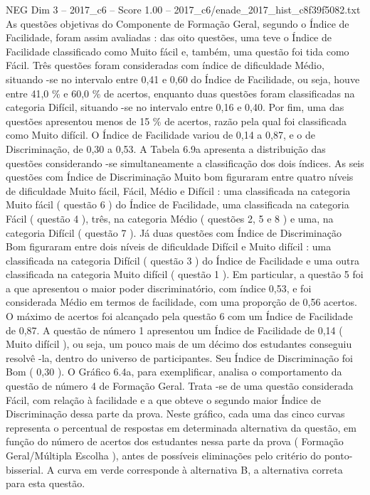 \begin{textsample}{NEG Dim 3 – 2017\_c6 – Score 1.00 – 2017\_c6/enade\_2017\_hist\_c8f39f5082.txt}
As questões objetivas do Componente de Formação Geral, segundo o Índice de Facilidade, foram assim avaliadas : das oito questões, uma teve o Índice de Facilidade classificado como Muito fácil e, também, uma questão foi tida como Fácil.
Três questões foram consideradas com índice de dificuldade Médio, situando -se no intervalo entre 0,41 e 0,60 do Índice de Facilidade, ou seja, houve entre 41,0 \% e 60,0 \% de acertos, enquanto duas questões foram classificadas na categoria Difícil, situando -se no intervalo entre 0,16 e 0,40.
Por fim, uma das questões apresentou menos de 15 \% de acertos, razão pela qual foi classificada como Muito difícil.
O Índice de Facilidade variou de 0,14 a 0,87, e o de Discriminação, de 0,30 a 0,53.
A Tabela 6.9a apresenta a distribuição das questões considerando -se simultaneamente a classificação dos dois índices.
As seis questões com Índice de Discriminação Muito bom figuraram entre quatro níveis de dificuldade Muito fácil, Fácil, Médio e Difícil : uma classificada na categoria Muito fácil ( questão 6 ) do Índice de Facilidade, uma classificada na categoria Fácil ( questão 4 ), três, na categoria Médio ( questões 2, 5 e 8 ) e uma, na categoria Difícil ( questão 7 ).
Já duas questões com Índice de Discriminação Bom figuraram entre dois níveis de dificuldade Difícil e Muito difícil : uma classificada na categoria Difícil ( questão 3 ) do Índice de Facilidade e uma outra classificada na categoria Muito difícil ( questão 1 ).
Em particular, a questão 5 foi a que apresentou o maior poder discriminatório, com índice 0,53, e foi considerada Médio em termos de facilidade, com uma proporção de 0,56 acertos.
O máximo de acertos foi alcançado pela questão 6 com um Índice de Facilidade de 0,87.
A questão de número 1 apresentou um Índice de Facilidade de 0,14 ( Muito difícil ), ou seja, um pouco mais de um décimo dos estudantes conseguiu resolvê -la, dentro do universo de participantes.
Seu Índice de Discriminação foi Bom ( 0,30 ).
O Gráfico 6.4a, para exemplificar, analisa o comportamento da questão de número 4 de Formação Geral.
Trata -se de uma questão considerada Fácil, com relação à facilidade e a que obteve o segundo maior Índice de Discriminação dessa parte da prova.
Neste gráfico, cada uma das cinco curvas representa o percentual de respostas em determinada alternativa da questão, em função do número de acertos dos estudantes nessa parte da prova ( Formação Geral/Múltipla Escolha ), antes de possíveis eliminações pelo critério do ponto-bisserial.
A curva em verde corresponde à alternativa B, a alternativa correta para esta questão.

\end{textsample}
